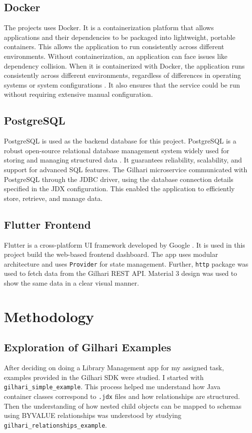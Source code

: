 \documentclass{book}
\begin{document}
\section{Docker}
The projects uses Docker. It is a containerization platform that allows applications and their dependencies to be packaged into lightweight, portable containers. This allows the application to run consistently across different environments. Without containerization, an application can face issues like dependency collision. When it is containerized with Docker, the application runs consistently across different environments, regardless of differences in operating systems or system configurations \cite{docker}. It also ensures that the service could be run without requiring extensive manual configuration.

\section{PostgreSQL}
PostgreSQL is used as the backend database for this project. PostgreSQL is a robust open-source relational database management system widely used for storing and managing structured data \cite{postgresql}. It guarantees reliability, scalability, and support for advanced SQL features. The Gilhari microservice communicated with PostgreSQL through the JDBC driver, using the database connection details specified in the JDX configuration. This enabled the application to efficiently store, retrieve, and manage data.
\section{Flutter Frontend}
Flutter is a cross-platform UI framework developed by Google \cite{flutter}. It is used in this project build the web-based frontend dashboard. The app uses modular architecture and uses \texttt{Provider} for state management. Further, \texttt{http} package was used to fetch data from the Gilhari REST API. Material 3 design was used to show the same data in a clear visual manner.
\chapter{Methodology}

\section{Exploration of Gilhari Examples}
After deciding on doing a Library Management app for my assigned task, examples provided in the Gilhari SDK were studied. I started with \texttt{gilhari\_simple\_example}. This process helped me understand how Java container classes correspond to \texttt{.jdx} files and how relationships are structured. Then the understanding of how nested child objects can be mapped to schemas using BYVALUE relationships was understood by studying \texttt{gilhari\_relationships\_example}.
\end{document}
